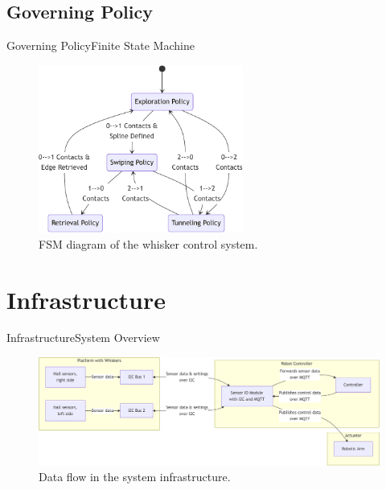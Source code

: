 \documentclass[AIRbeamer
,optEnglish
,optBiber
,optBibstyleAlphabetic
,optBeamerClassicFormat%
]{AIRlatex}
\begin{document}
    \subsection{Governing Policy}
    \begin{frame}{Governing Policy}{Finite State Machine}
        \begin{figure}[H]
            \centering
            \includegraphics[width=0.6\textwidth]{figures/fsm}
            \caption{FSM diagram of the whisker control system.}
        \end{figure}
    \end{frame}


    \section{Infrastructure}
    \begin{frame}{Infrastructure}{System Overview}
        \begin{figure}[H]
            \centering
            \includegraphics[width=\textwidth]{figures/infrastructure-overview}
            \caption{Data flow in the system infrastructure.}
        \end{figure}
    \end{frame}
\end{document}
